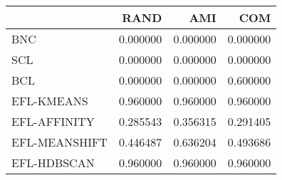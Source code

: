 \begin{tabular}{lrrr}
\toprule
 & RAND & AMI & COM \\
\midrule
BNC & 0.000000 & 0.000000 & 0.000000 \\
SCL & 0.000000 & 0.000000 & 0.000000 \\
BCL & 0.000000 & 0.000000 & 0.600000 \\
EFL-KMEANS & 0.960000 & 0.960000 & 0.960000 \\
EFL-AFFINITY & 0.285543 & 0.356315 & 0.291405 \\
EFL-MEANSHIFT & 0.446487 & 0.636204 & 0.493686 \\
EFL-HDBSCAN & 0.960000 & 0.960000 & 0.960000 \\
\bottomrule
\end{tabular}
